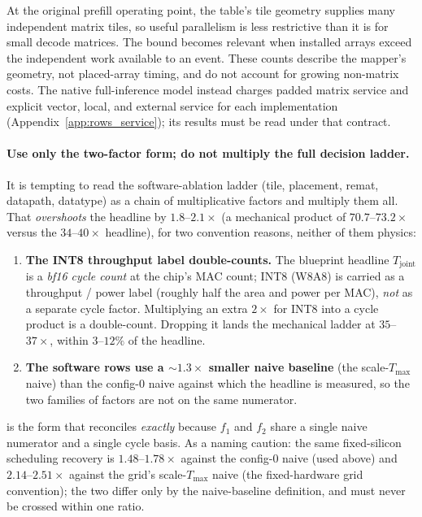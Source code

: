 At the original prefill operating point, the table's tile geometry supplies many independent matrix tiles, so useful parallelism is less restrictive than it is for small decode matrices.
The bound becomes relevant when installed arrays exceed the independent work available to an event.
These counts describe the mapper's geometry, not placed-array timing, and do not account for growing non-matrix costs.
The native full-inference model instead charges padded matrix service and explicit vector, local, and external service for each implementation (Appendix~\ref{app:rows_service}); its results must be read under that contract.

\paragraph{Use only the two-factor form; do not multiply the full decision ladder.}
It is tempting to read the software-ablation ladder (tile, placement, remat, datapath, datatype) as a chain of multiplicative factors and multiply them all.
That \emph{overshoots} the headline by $1.8$--$2.1\times$ (a mechanical product of $70.7$--$73.2\times$ versus the $34$--$40\times$ headline), for two convention reasons, neither of them physics:
\begin{enumerate}
\item \textbf{The INT8 throughput label double-counts.} The blueprint headline
$T_{\mathrm{joint}}$ is a \emph{bf16 cycle count} at the chip's MAC count; INT8 (W8A8) is carried as a throughput / power label (roughly half the area and power per MAC), \emph{not} as a separate cycle factor.
Multiplying an extra $2\times$ for INT8 into a cycle product is a double-count.
Dropping it lands the mechanical ladder at $35$--$37\times$, within $3$--$12\%$ of the headline.
\item \textbf{The software rows use a $\sim1.3\times$ smaller naive baseline}
(the scale-$T_{\max}$ naive) than the config-0 naive against which the headline is measured, so the two families of factors are not on the same numerator.
\end{enumerate}
 is the form that reconciles \emph{exactly} because $f_1$ and $f_2$ share a single naive numerator and a single cycle basis.
As a naming caution: the same fixed-silicon scheduling recovery is $1.48$--$1.78\times$ against the config-0 naive (used above) and $2.14$--$2.51\times$ against the grid's scale-$T_{\max}$ naive (the fixed-hardware grid convention); the two differ only by the naive-baseline definition, and must never be crossed within one ratio.

